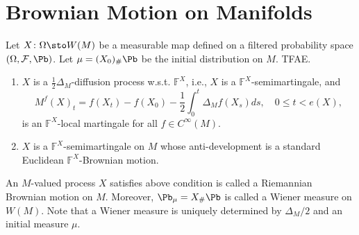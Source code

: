 \section{Brownian Motion on Manifolds}

\begin{thm}
    Let $X \colon \Omega \sto W(M)$ be a measurable map defined on a filtered probability space $(\Omega,\mathcal{F},\Pb)$. Let $\mu = (X_0)_{\#}\Pb$ be the initial distribution on $M$. TFAE.
    \begin{enumerate}[label=(\arabic{*})]
        \item $X$ is a $\frac{1}{2}\Delta_M$-diffusion process w.s.t. $\mathbb{F}^X$, i.e., $X$ is a $\mathbb{F}^X$-semimartingale, and
        \begin{equation*}
            M^f(X)_t = f(X_t) - f(X_0) - \frac{1}{2}\int_0^t \Delta_Mf(X_s)ds,\quad 0\leq t < e(X),
        \end{equation*}
        is an $\mathbb{F}^X$-local martingale for all $f \in C^\infty(M)$.

        \item $X$ is a $\mathbb{F}^X$-semimartingale on $M$ whose anti-development is a standard Euclidean $\mathbb{F}^X$-Brownian motion.
    \end{enumerate}
\end{thm}
\begin{rmk}
    An $M$-valued process $X$ satisfies above condition is called a Riemannian Brownian motion on $M$. Moreover, $\Pb_\mu = X_{\#}\Pb$ is called a Wiener measure on $W(M)$. Note that a Wiener measure is uniquely determined by $\Delta_M / 2$ and an initial measure $\mu$.
\end{rmk}
